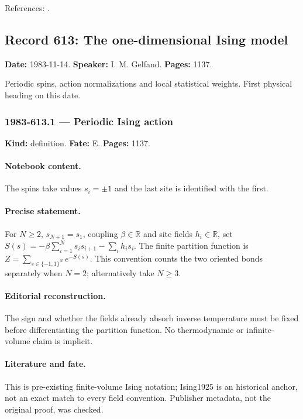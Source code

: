 \noindent References: \citep{novikov1982hamiltonian}.\par

\subsection{Record 613: The one-dimensional Ising model}

\label{talk:613}

\noindent\textbf{Date:} 1983-11-14. \textbf{Speaker:} I. M. Gelfand. \textbf{Pages:} 1137.\par

Periodic spins, action normalizations and local statistical weights. First physical heading on this date.

\subsubsection{1983-613.1 --- Periodic Ising action}

\label{item:1983-613.1}

\noindent\textbf{Kind:} definition. \textbf{Fate:} E. \textbf{Pages:} 1137.\par

\paragraph{Notebook content.} The spins take values $s_i=\pm1$ and the last site is identified with the first.

\paragraph{Precise statement.} For $N\ge2$, $s_{N+1}=s_1$, coupling $\beta\in\mathbb R$ and site fields $h_i\in\mathbb R$, set $S(s)=-\beta\sum_{i=1}^N s_i s_{i+1}-\sum_i h_i s_i$. The finite partition function is $Z=\sum_{s\in\{-1,1\}^N}e^{-S(s)}$. This convention counts the two oriented bonds separately when $N=2$; alternatively take $N\ge3$.

\paragraph{Editorial reconstruction.} The sign and whether the fields already absorb inverse temperature must be fixed before differentiating the partition function. No thermodynamic or infinite-volume claim is implicit.

\paragraph{Literature and fate.} This is pre-existing finite-volume Ising notation; Ising1925 is an historical anchor, not an exact match to every field convention. Publisher metadata, not the original proof, was checked.


